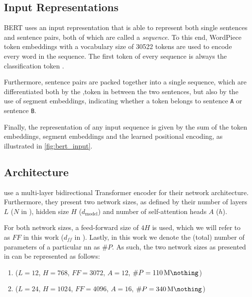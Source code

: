 \subsection{Input Representations}

BERT uses an input representation that is able to represent both single sentences and sentence pairs, both of which are called a \emph{sequence}. To this end, WordPiece token embeddings \citep{wu2016google} with a vocabulary size of 30522 tokens are used to encode every word in the sequence. The first token of every sequence is always the classification token \cls. 

Furthermore, sentence pairs are packed together into a single sequence, which are differentiated both by the \sep token in between the two sentences, but also by the use of segment embeddings, indicating whether a token belongs to sentence \texttt{A} or sentence \texttt{B}.

Finally, the representation of any input sequence is given by the sum of the token embeddings, segment embeddings and the learned positional encoding, as illustrated in \cref{fig:bert_input}.

\begin{figure*}[ht!]
    \centering
    \def\svgscale{0.8}
    
    \caption[BERT input representation]{The representation of an input sequence for BERT is the sum of the token embeddings, segment embeddings, and positional embeddings. Source: \href{https://d2l.ai/chapter_natural-language-processing-pretraining/bert.html\#input-representation}{Dive into Deep Learning}}
    \label{fig:bert_input}
\end{figure*}

\subsection{Architecture}
\citet{devlin2018bert} use a multi-layer bidirectional Transformer encoder for their network architecture. Furthermore, they present two network sizes, as defined by their number of layers $L$ ($N$ in \citet{vaswani2017attention}), hidden size $H$ ($d_{\text{model}}$) and number of self-attention heads $A$ ($h$).

For both network sizes, a feed-forward size of $4H$ is used, which we will refer to as $FF$ in this work ($d_{ff}$ in \citet{vaswani2017attention}). Lastly, in this work we denote the (total) number of parameters of a particular \gls{nn} as $\#P$. As such, the two network sizes as presented in \citet{devlin2018bert} can be represented as follows:
\begin{enumerate}
    \item \bertbase ($L=12$, $H=768$, $FF=3072$, $A=12$, $\#P=\SI{110}{\mega\nothing}$)
    \item \bertlarge ($L=24$, $H=1024$, $FF=4096$, $A=16$, $\#P=\SI{340}{\mega\nothing}$)
\end{enumerate}

